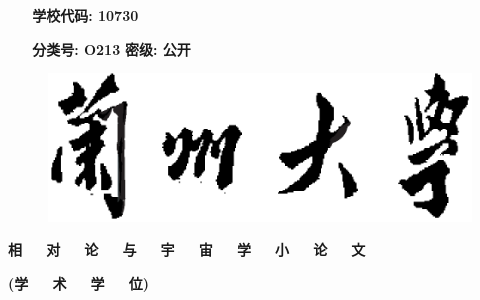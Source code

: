 \begin{titlepage}
\vspace{-.5cm}\song \fontsize{10.5pt}{13pt}\selectfont
{\bf ~~~学校代码: 10730}
\vspace{0.4cm}
\begin{center}
\begin{center}
\vspace{-.5cm}\song \fontsize{10.5pt}{13pt}\selectfont
{\bf  ~~~分类号: O213}  \hskip 3.3in {\bf 密级: 公开}
\end{center}
\begin{center}
\begin{figure}[htbp]
	\centering
	\includegraphics[width=2.5 in,height=0.7 in]{Img/LZDX.eps}
\end{figure}
\end{center}
\vspace{-1.5cm} \fontsize{20.74pt}{13pt}\selectfont
\begin{center}
{\bf {\song\selectfont  相~~~对~~~论~~~与~~~宇~~~宙~~~学~~~小~~~论~~~文}}
\end{center}
\vspace{0.8cm}
\vspace{-1.0cm} \fontsize{16pt}{13pt}\selectfont
\begin{center}
{\bf ({\kai\selectfont 学~~~术~~~学~~~位})}
\end{center}



\end{center}
\end{titlepage}
